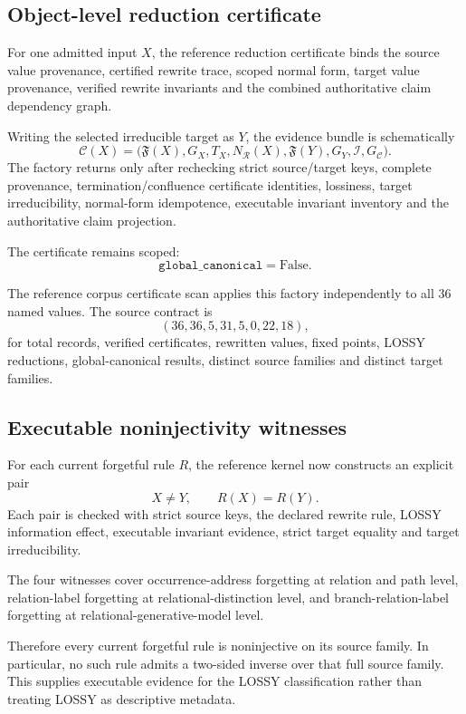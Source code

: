 \documentclass[11pt]{article}
\begin{document}
\subsection{Object-level reduction certificate}

For one admitted input \(X\), the reference reduction certificate binds the source value provenance, certified rewrite trace, scoped normal form, target value provenance, verified rewrite invariants and the combined authoritative claim dependency graph.

Writing the selected irreducible target as \(Y\), the evidence bundle is schematically
\[
\mathcal C(X)=\bigl(\mathfrak F(X),G_X,T_X,N_{\mathcal R}(X),\mathfrak F(Y),G_Y,\mathcal I,G_{\mathcal C}\bigr).
\]
The factory returns only after rechecking strict source/target keys, complete provenance, termination/confluence certificate identities, lossiness, target irreducibility, normal-form idempotence, executable invariant inventory and the authoritative claim projection.

The certificate remains scoped:
\[
\boxed{\texttt{global\_canonical}=\mathrm{False}.}
\]

The reference corpus certificate scan applies this factory independently to all 36 named values. The source contract is
\[
(36,36,5,31,5,0,22,18),
\]
for total records, verified certificates, rewritten values, fixed points, LOSSY reductions, global-canonical results, distinct source families and distinct target families.

\subsection{Executable noninjectivity witnesses}

For each current forgetful rule \(R\), the reference kernel now constructs an explicit pair
\[
X\neq Y,
\qquad
R(X)=R(Y).
\]
Each pair is checked with strict source keys, the declared rewrite rule, LOSSY information effect, executable invariant evidence, strict target equality and target irreducibility.

The four witnesses cover occurrence-address forgetting at relation and path level, relation-label forgetting at relational-distinction level, and branch-relation-label forgetting at relational-generative-model level.

Therefore every current forgetful rule is noninjective on its source family. In particular, no such rule admits a two-sided inverse over that full source family. This supplies executable evidence for the LOSSY classification rather than treating LOSSY as descriptive metadata.
\end{document}
